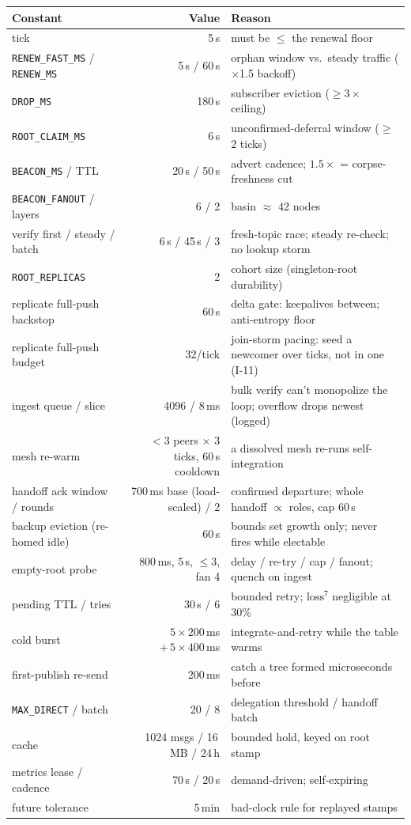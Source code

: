 \documentclass[nobib]{tufte-handout}
\begin{document}
\begin{table}[h]
\scriptsize
\begin{tabular}{@{}lrl@{}}
\toprule
Constant & Value & Reason \\
\midrule
tick & 5\,s & must be $\le$ the renewal floor \\
\texttt{RENEW\_FAST\_MS} / \texttt{RENEW\_MS} & 5\,s / 60\,s & orphan window vs.\ steady traffic ($\times$1.5 backoff) \\
\texttt{DROP\_MS} & 180\,s & subscriber eviction ($\ge3\times$ ceiling) \\
\texttt{ROOT\_CLAIM\_MS} & 6\,s & unconfirmed-deferral window ($\ge$2 ticks) \\
\texttt{BEACON\_MS} / TTL & 20\,s / 50\,s & advert cadence; $1.5\times$ = corpse-freshness cut \\
\texttt{BEACON\_FANOUT} / layers & 6 / 2 & basin $\approx$ 42 nodes \\
verify first / steady / batch & 6\,s / 45\,s / 3 & fresh-topic race; steady re-check; no lookup storm \\
\texttt{ROOT\_REPLICAS} & 2 & cohort size (singleton-root durability) \\
replicate full-push backstop & 60\,s & delta gate: keepalives between; anti-entropy floor \\
replicate full-push budget & 32/tick & join-storm pacing: seed a newcomer over ticks, not in one (I-11) \\
ingest queue / slice & 4096 / 8\,ms & bulk verify can't monopolize the loop; overflow drops newest (logged) \\
mesh re-warm & $<$3 peers $\times$ 3 ticks, 60\,s cooldown & a dissolved mesh re-runs self-integration \\
handoff ack window / rounds & 700\,ms base (load-scaled) / 2 & confirmed departure; whole handoff $\propto$ roles, cap 60\,s \\
backup eviction (re-homed idle) & 60\,s & bounds set growth only; never fires while electable \\
empty-root probe & 800\,ms, 5\,s, $\le$3, fan 4 & delay / re-try / cap / fanout; quench on ingest \\
pending TTL / tries & 30\,s / 6 & bounded retry; $\mathrm{loss}^7$ negligible at 30\% \\
cold burst & $5\times200$\,ms $+\,5\times400$\,ms & integrate-and-retry while the table warms \\
first-publish re-send & 200\,ms & catch a tree formed microseconds before \\
\texttt{MAX\_DIRECT} / batch & 20 / 8 & delegation threshold / handoff batch \\
cache & 1024 msgs / 16\,MB / 24\,h & bounded hold, keyed on root stamp \\
metrics lease / cadence & 70\,s / 20\,s & demand-driven; self-expiring \\
future tolerance & 5\,min & bad-clock rule for replayed stamps \\
\bottomrule
\end{tabular}
\end{table}
\end{document}

